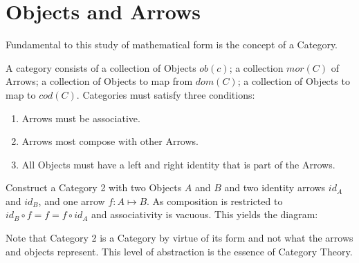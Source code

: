 \documentclass{article}
\begin{document}
\section{Objects and Arrows}
Fundamental to this study of mathematical form is the concept of a Category.
\begin{definition}
A category consists of a collection of Objects $ob(c)$; a collection $mor(C)$ of Arrows; a collection of Objects to map from $dom(C)$; a collection of Objects to map to $cod(C)$. Categories must satisfy three conditions: \begin{enumerate}
    \item Arrows must be associative.
    \item Arrows most compose with other Arrows.
    \item All Objects must have a left and right identity that is part of the Arrows.
  \end{enumerate}
\end{definition}
\begin{example}
Construct a Category 2 with two Objects $A$ and $B$ and two identity arrows $id_A$ and $id_B$, and one arrow $f: A \mapsto B$. As composition is restricted to $id_B \circ f = f = f \circ id_A$ and associativity is vacuous. This yields the diagram:
\begin{center}
\end{center}
\end{example}
\begin{remark}
Note that Category 2 is a Category by virtue of its form and not what the arrows and objects represent. This level of abstraction is the essence of Category Theory.
\end{remark}
\end{document}
